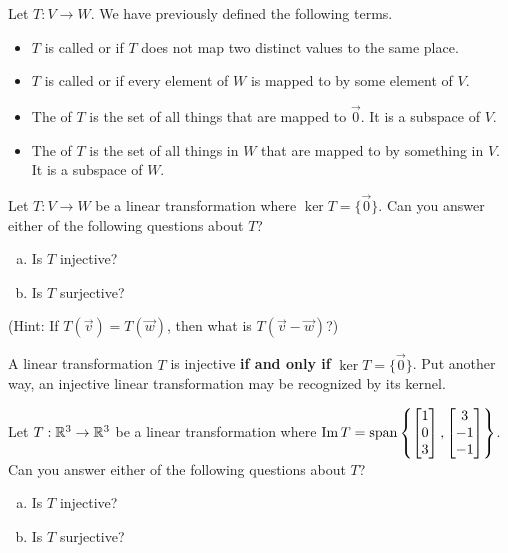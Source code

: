 


\begin{applicationActivities}{3}{19}

\begin{observation}
Let $T: V \rightarrow W$.  We have previously defined the following
terms.
\begin{itemize}
\item  $T$ is called  or  if $T$ does not map two distinct values to the same place.
\item $T$ is called  or  if every element of $W$ is mapped to by some element of $V$.
\item The  of $T$ is the set of all things that are mapped to $\vec{0}$.  It is a subspace of $V$.
\item The  of $T$ is the set of all things in $W$ that are mapped to by something in $V$.  It is a subspace of $W$.
\end{itemize}
\end{observation}

\begin{activity}{5}
Let $T: V \rightarrow W$ be a linear transformation where
$\ker T = \{ \vec{0} \}$. Can you answer either of the following questions
about \(T\)?
\begin{enumerate}[(a)]
\item Is $T$ injective?
\item Is $T$ surjective?
\end{enumerate}
(Hint: If $T(\vec{v})=T(\vec{w})$, then what is $T(\vec{v}-\vec{w})$?)
\end{activity}

\begin{fact}
A linear transformation $T$ is injective \textbf{if and only if} $\ker T = \{\vec{0}\}$. Put another way, an injective linear transformation may be
recognized by its  kernel.
\end{fact}

\begin{activity}{5}
Let $T: \mathbb{R}^3 \rightarrow \mathbb{R}^3$ be a linear transformation where
$\operatorname{Im} T = \operatorname{span} \left\{ \begin{bmatrix} 1 \\ 0 \\ 3 \end{bmatrix}, \begin{bmatrix} 3 \\ -1 \\ -1 \end{bmatrix} \right\}$.
Can you answer either of the following questions about \(T\)?
\begin{enumerate}[(a)]
\item Is $T$ injective?
\item Is $T$ surjective?
\end{enumerate}
\end{activity}


\end{applicationActivities}

